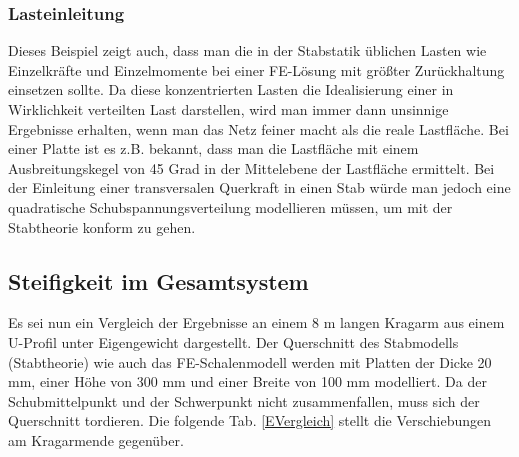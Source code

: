 {\textcolor{sectionTitleBlue}{\subsubsection*{Lasteinleitung}}}

Dieses Beispiel zeigt auch, dass man die in der Stabstatik \"{u}blichen Lasten wie Einzelkr\"{a}fte und Einzelmomente bei einer FE-L\"{o}sung mit gr\"{o}{\ss}ter Zur\"{u}ckhaltung einsetzen sollte. Da diese konzentrierten Lasten die Idealisierung einer in Wirklichkeit verteilten Last darstellen, wird man immer dann unsinnige Ergebnisse erhalten, wenn man das Netz feiner macht als die reale Lastfl\"{a}che. Bei einer Platte ist es z.B. bekannt, dass man die Lastfl\"{a}che mit einem Ausbreitungskegel von 45 Grad in der Mittelebene der Lastfl\"{a}che ermittelt. Bei der Einleitung einer transversalen Querkraft in einen Stab w\"{u}rde man jedoch eine quadratische Schubspannungsverteilung modellieren m\"{u}ssen, um mit der Stabtheorie konform zu gehen.

{\textcolor{sectionTitleBlue}{\subsection{Steifigkeit im Gesamtsystem}}}
Es sei nun ein Vergleich der Ergebnisse an einem 8 m langen Kragarm aus einem U-Profil unter Eigengewicht dargestellt. Der Querschnitt des Stabmodells (Stabtheorie) wie auch das FE-Schalenmodell werden mit Platten der Dicke  20 mm, einer H\"{o}he von 300 mm und einer Breite von 100 mm modelliert. Da der Schubmittelpunkt und der Schwerpunkt nicht zusammenfallen, muss sich der Querschnitt tordieren.  Die folgende Tab. \ref{EVergleich} stellt die Verschiebungen am Kragarmende gegen\"{u}ber.

